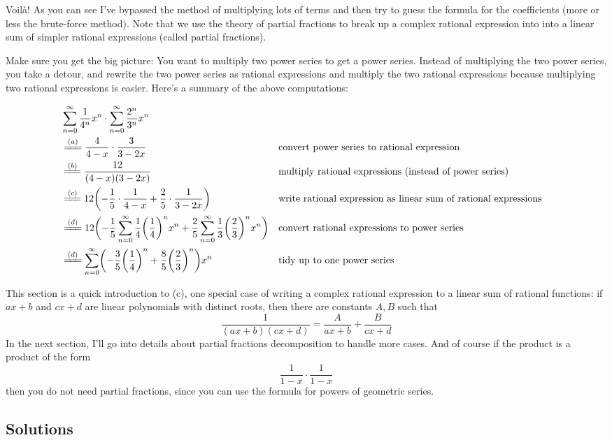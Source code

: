 Voil\`a!
As you can see I've bypassed the 
method of multiplying lots of terms and then try to guess
the formula for the coefficients (more or less the brute-force
method).
Note that we use the theory of partial fractions to 
break up a complex rational expression into
into a linear sum of simpler rational expressions (called partial fractions).

Make sure you get the big picture:
You want to multiply two power series to get a power series.
Instead of multiplying the two power series, you take a detour,
and rewrite the two power series as rational expressions
and multiply the two rational expressions because
multiplying two rational expressions is easier.
Here's a summary of the above computations:

\newcommand\tmpAA{\sum_{n=0}^\infty \frac{1}{4^n} x^n \cdot \sum_{n=0}^\infty \frac{2^n}{3^n} x^n }
\newcommand\tmpBB{\frac{4}{4 - x} \cdot  \frac{3}{3 - 2x}}
\newcommand\tmpCC{\frac{12}{(4-x)(3-2x)}}
\newcommand\tmpDD{12 \biggl( -\frac{1}{5} \cdot \frac{1}{4-x} + \frac{2}{5}\cdot \frac{1}{3-2x} \biggr)}
\newcommand\tmpEE{12 \biggl( 
-\frac{1}{5}  \sum_{n=0}^\infty \frac{1}{4} \biggl( \frac{1}{4} \biggr)^n x^n +
\frac{2}{5}  \sum_{n=0}^\infty \frac{1}{3} \biggl( \frac{2}{3} \biggr)^n x^n
\biggr) 
}
\newcommand\tmpFF{
\sum_{n=0}^\infty 
\biggl( 
-\frac{3}{5} \biggl( \frac{1}{4} \biggr)^n +
\frac{8}{5} \biggl( \frac{2}{3} \biggr)^n
\biggr) x^n
}

{\footnotesize
\begin{align*}
&\tmpAA \\ 
&\xlongequal{(a)} \tmpBB & & \text{convert power series to rational expression} \\
&\xlongequal{(b)} \tmpCC & & \text{multiply rational expressions (instead of power series)}\\
&\xlongequal{(c)} \tmpDD & & \text{write rational expression as linear sum of rational expressions}\\
&\xlongequal{(d)} \tmpEE & & \text{convert rational expressions to power series} \\
&\xlongequal{(d)} \tmpFF & & \text{tidy up to one power series}
\end{align*}
}

This section is a quick introduction to (c), one special case of
writing a complex rational expression to a linear sum of
rational functions:
if $ax + b$ and $cx + d$ are linear polynomials with distinct roots,
then there are constants $A, B$ such that
\[
\frac{1}{(ax + b)(cx + d)} = \frac{A}{ax + b} + \frac{B}{cx + d}
\]
In the next section, I'll go into details about
partial fractions decomposition to handle more cases.
And of course if the product is a product of the form
\[
\frac{1}{1 - x}
\cdot
\frac{1}{1 - x}
\]
then you do not need partial fractions, since you can
use the formula for powers of geometric series.


\newpage

\newpage
\subsection*{Solutions}
